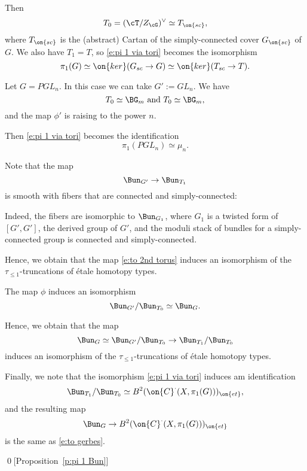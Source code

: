 \documentclass[9pt]{amsart}
\theoremstyle{remark}
\theoremstyle{definition}
\theoremstyle{remark}
\newcommand{\propref}[1]{Proposition~\ref{#1}}
\numberwithin{equation}{section}
\begin{document}
\medskip

Then $$T_0=(\cT/Z_\cG)^\vee \simeq T_{\on{sc}},$$ where $T_{\on{sc}}$ is the (abstract) Cartan
of the simply-connected cover $G_{\on{sc}}$ of $G$. We also have $T_1=T$, so \eqref{e:pi 1 via tori} becomes
the isomorphism
$$\pi_1(G)\simeq \on{ker}(G_{sc}\to G)\simeq \on{ker}(T_{sc}\to T).$$


Let $G=PGL_n$. In this case we can take $G':=GL_n$. 
We have 
$$T_0\simeq \BG_m \text{ and } T_0\simeq \BG_m,$$
and the map $\phi'$ is raising to the power $n$. 

\medskip

Then \eqref{e:pi 1 via tori} becomes the identification
$$\pi_1(PGL_n)\simeq \mu_n.$$

\sssec{}

Note that the map
\begin{equation} \label{e:to 2nd torus}
\Bun_{G'}\to \Bun_{T_1}
\end{equation} 
is smooth with fibers that are connected and simply-connected:

\medskip

Indeed, the fibers are isomorphic to $\Bun_{G_1}$,
where $G_1$ is a twisted form of $[G',G']$, the derived group of $G'$, and
the moduli stack of bundles for a simply-connected group is connected and 
simply-connected. 

\medskip

Hence, we obtain that the map \eqref{e:to 2nd torus}
induces an isomorphism of the $\tau_{\leq 1}$-truncations of \'etale homotopy types.

\sssec{}

The map $\phi$ induces an isomorphism
$$\Bun_{G'}/\Bun_{T_0}\simeq \Bun_G.$$

\medskip

Hence, we obtain that the map
$$\Bun_G\simeq \Bun_{G'}/\Bun_{T_0}\to \Bun_{T_1}/\Bun_{T_0}$$
induces an isomorphism of the $\tau_{\leq 1}$-truncations of \'etale homotopy types.

\sssec{}

Finally, we note that the isomorphism \eqref{e:pi 1 via tori} induces am identification 
$$\Bun_{T_1}/\Bun_{T_0} \simeq B^2(\on{C}^\cdot(X,\pi_1(G)))_{\on{et}},$$
and the resulting map
$$\Bun_G\to B^2(\on{C}^\cdot(X,\pi_1(G)))_{\on{et}}$$
is the same as \eqref{e:to gerbes}.

\qed[\propref{p:pi 1 Bun}]

\ssec{Proof of \propref{p:compl 1}} \label{ss:proof of compl 1}
\end{document}
